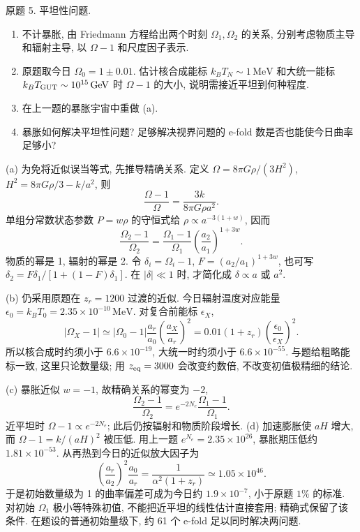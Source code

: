 \begin{exercise}\label{ps:9.5}
原题 5. 平坦性问题.
\begin{enumerate}[label=(\alph*)]
\item 不计暴胀, 由 Friedmann 方程给出两个时刻 $\Omega_1,\Omega_2$ 的关系, 分别考虑物质主导和辐射主导, 以 $\Omega-1$ 和尺度因子表示.
\item 原题取今日 $\Omega_0=1\pm0.01$. 估计核合成能标 $k_BT_N\sim1\,\mathrm{MeV}$ 和大统一能标 $k_BT_{\rm GUT}\sim10^{15}\,\mathrm{GeV}$ 时 $\Omega-1$ 的大小, 说明需接近平坦到何种程度.
\item 在上一题的暴胀宇宙中重做 (a).
\item 暴胀如何解决平坦性问题? 足够解决视界问题的 e-fold 数是否也能使今日曲率足够小?
\end{enumerate}
\end{exercise}
\begin{solution}
(a) 为免将近似误当等式, 先推导精确关系. 定义 $\Omega=8\pi G\rho/(3H^2)$, $H^2=8\pi G\rho/3-k/a^2$, 则
\[
\frac{\Omega-1}{\Omega}=\frac{3k}{8\pi G\rho a^2}.
\]
单组分常数状态参数 $P=w\rho$ 的守恒式给 $\rho\propto a^{-3(1+w)}$, 因而
\[
\frac{\Omega_2-1}{\Omega_2}
=\frac{\Omega_1-1}{\Omega_1}\left(\frac{a_2}{a_1}\right)^{1+3w}.
\]
物质的幂是 1, 辐射的幂是 2. 令 $\delta_i=\Omega_i-1$, $F=(a_2/a_1)^{1+3w}$, 也可写 $\delta_2=F\delta_1/[1+(1-F)\delta_1]$. 在 $|\delta|\ll1$ 时, 才简化成 $\delta\propto a$ 或 $a^2$.

(b) 仍采用原题在 $z_r=1200$ 过渡的近似. 今日辐射温度对应能量 $\epsilon_0=k_BT_0=2.35\times10^{-10}\,\mathrm{MeV}$. 对复合前能标 $\epsilon_X$,
\[
|\Omega_X-1|\simeq |\Omega_0-1|\frac{a_r}{a_0}
\left(\frac{a_X}{a_r}\right)^2
=0.01(1+z_r)\left(\frac{\epsilon_0}{\epsilon_X}\right)^2.
\]
所以核合成时约须小于 $6.6\times10^{-19}$, 大统一时约须小于 $6.6\times10^{-55}$. 与题给粗略能标一致, 这里只论数量级; 用 $z_{\rm eq}=3000$ 会改变约数倍, 不改变初值极精细的结论.

(c) 暴胀近似 $w=-1$, 故精确关系的幂变为 $-2$,
\[
\frac{\Omega_2-1}{\Omega_2}
=e^{-2N_e}\frac{\Omega_1-1}{\Omega_1}.
\]
近平坦时 $\Omega-1\propto e^{-2N_e}$; 此后仍按辐射和物质阶段增长.
(d) 加速膨胀使 $aH$ 增大, 而 $\Omega-1=k/(aH)^2$ 被压低. 用上一题 $e^{N_e}=2.35\times10^{26}$, 暴胀期压低约 $1.81\times10^{-53}$. 从再热到今日的近似放大因子为
\[
\left(\frac{a_r}{a_2}\right)^2\frac{a_0}{a_r}
=\frac{1}{\alpha^2(1+z_r)}\simeq1.05\times10^{46}.
\]
于是初始数量级为 1 的曲率偏差可成为今日约 $1.9\times10^{-7}$, 小于原题 $1\%$ 的标准. 对初始 $\Omega_1$ 极小等特殊初值, 不能把近平坦的线性估计直接套用; 精确式保留了该条件. 在题设的普通初始量级下, 约 61 个 e-fold 足以同时解决两问题.
\end{solution}

